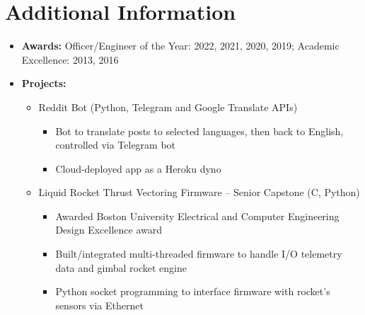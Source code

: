 \documentclass{article}
\begin{document}
\section{Additional Information} 
\begin{itemize}
    \itemsep0.2em
    \item \textbf{Awards: }Officer/Engineer of the Year: 2022, 2021, 2020, 2019; Academic Excellence: 2013, 2016
    \item \textbf{Projects: }
    \vspace{-\topsep} \vspace{0.2em}
    \begin{itemize}
        \itemsep0em
        \item Reddit Bot (Python, Telegram and Google Translate APIs)
        \vspace{-\topsep} \vspace{0.2em}
        \begin{itemize}
            \itemsep0em
            \item Bot to translate posts to selected languages, then back to English, controlled via Telegram bot
            \item Cloud-deployed app as a Heroku dyno
        \end{itemize}
        \item Liquid Rocket Thrust Vectoring Firmware – Senior Capstone (C, Python)
        \vspace{-\topsep} \vspace{0.2em}
        \begin{itemize}
            \itemsep0em
            \item Awarded Boston University Electrical and Computer Engineering Design Excellence award
            \item Built/integrated multi-threaded firmware to handle I/O telemetry data and gimbal rocket engine
            \item Python socket programming to interface firmware with rocket’s sensors via Ethernet
        \end{itemize}
    \end{itemize} \end{itemize} 

\end{document}
